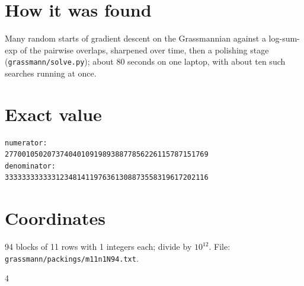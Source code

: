 \documentclass[11pt,a4paper]{article}
\begin{document}
\section{How it was found}
Many random starts of gradient descent on the Grassmannian against a log-sum-exp of the pairwise overlaps, sharpened over time, then a polishing stage (\texttt{grassmann/solve.py}); about 80 seconds on one laptop, with about ten such searches running at once.


\appendix
\section{Exact value}
{\small
\begin{verbatim}
numerator:
277001050207374040109198938877856226115787151769
denominator:
333333333333123481411976361308873558319617202116
\end{verbatim}}

\section{Coordinates}
94 blocks of 11 rows with 1 integers each; divide by $10^{12}$. File: \texttt{grassmann/packings/m11n1N94.txt}.
{\tiny
\begin{multicols}{4}
\end{multicols}}
\end{document}

